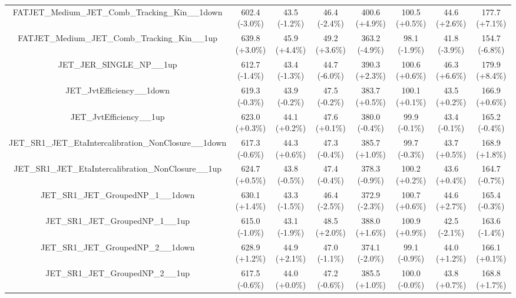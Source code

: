 \begin{table}[htbp!]
\begin{tiny}
\begin{center}
\begin{tabular}{c|c|c|c||c|c|c|c}
FATJET\_Medium\_JET\_Comb\_Tracking\_Kin\_\_1down            & 602.4     (-3.0\%) & 43.5      (-1.2\%) & 46.4      (-2.4\%) & 400.6     (+4.9\%) & 100.5     (+0.5\%) & 44.6      (+2.6\%) & 177.7     (+7.1\%) \\ 
FATJET\_Medium\_JET\_Comb\_Tracking\_Kin\_\_1up              & 639.8     (+3.0\%) & 45.9      (+4.4\%) & 49.2      (+3.6\%) & 363.2     (-4.9\%) & 98.1      (-1.9\%) & 41.8      (-3.9\%) & 154.7     (-6.8\%) \\ 
JET\_JER\_SINGLE\_NP\_\_1up                                  & 612.7     (-1.4\%) & 43.4      (-1.3\%) & 44.7      (-6.0\%) & 390.3     (+2.3\%) & 100.6     (+0.6\%) & 46.3      (+6.6\%) & 179.9     (+8.4\%) \\ 
JET\_JvtEfficiency\_\_1down                                  & 619.3     (-0.3\%) & 43.9      (-0.2\%) & 47.5      (-0.2\%) & 383.7     (+0.5\%) & 100.1     (+0.1\%) & 43.5      (+0.2\%) & 166.9     (+0.6\%) \\ 
JET\_JvtEfficiency\_\_1up                                    & 623.0     (+0.3\%) & 44.1      (+0.2\%) & 47.6      (+0.1\%) & 380.0     (-0.4\%) & 99.9      (-0.1\%) & 43.4      (-0.1\%) & 165.2     (-0.4\%) \\ 
JET\_SR1\_JET\_EtaIntercalibration\_NonClosure\_\_1down      & 617.3     (-0.6\%) & 44.3      (+0.6\%) & 47.3      (-0.4\%) & 385.7     (+1.0\%) & 99.7      (-0.3\%) & 43.7      (+0.5\%) & 168.9     (+1.8\%) \\ 
JET\_SR1\_JET\_EtaIntercalibration\_NonClosure\_\_1up        & 624.7     (+0.5\%) & 43.8      (-0.5\%) & 47.4      (-0.4\%) & 378.3     (-0.9\%) & 100.2     (+0.2\%) & 43.6      (+0.4\%) & 164.7     (-0.7\%) \\ 
JET\_SR1\_JET\_GroupedNP\_1\_\_1down                         & 630.1     (+1.4\%) & 43.3      (-1.5\%) & 46.4      (-2.5\%) & 372.9     (-2.3\%) & 100.7     (+0.6\%) & 44.6      (+2.7\%) & 165.4     (-0.3\%) \\ 
JET\_SR1\_JET\_GroupedNP\_1\_\_1up                           & 615.0     (-1.0\%) & 43.1      (-1.9\%) & 48.5      (+2.0\%) & 388.0     (+1.6\%) & 100.9     (+0.9\%) & 42.5      (-2.1\%) & 163.6     (-1.4\%) \\ 
JET\_SR1\_JET\_GroupedNP\_2\_\_1down                         & 628.9     (+1.2\%) & 44.9      (+2.1\%) & 47.0      (-1.1\%) & 374.1     (-2.0\%) & 99.1      (-0.9\%) & 44.0      (+1.2\%) & 166.1     (+0.1\%) \\ 
JET\_SR1\_JET\_GroupedNP\_2\_\_1up                           & 617.5     (-0.6\%) & 44.0      (+0.0\%) & 47.2      (-0.6\%) & 385.5     (+1.0\%) & 100.0     (-0.0\%) & 43.8      (+0.7\%) & 168.8     (+1.7\%) \\ 

\end{tabular}
\end{center}
\end{tiny}
\end{table}
